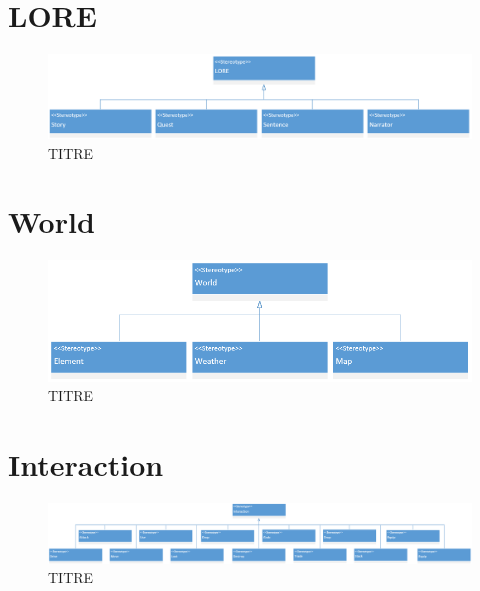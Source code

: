 \section*{LORE}
\begin{figure}[H]
    \centering
    \includegraphics[width=14cm]{10_img/chap5/04_00_lore.PNG} 
    \caption{TITRE}
\end{figure}


\section*{World}
\begin{figure}[H]
    \centering
    \includegraphics[width=14cm]{10_img/chap5/05_00_world.PNG} 
    \caption{TITRE}
\end{figure}


\section*{Interaction}
\begin{figure}[H]
    \centering
    \includegraphics[width=14cm]{10_img/chap5/06_00_interaction.PNG} 
    \caption{TITRE}
\end{figure}